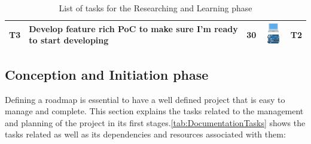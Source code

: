\begin{table}[ht]
{\begin{tabular}{|c|l|c|c|c|}
  \rowcolor[HTML]{C0C0C0}
T3 &
  \textbf{Develop feature rich PoC to make sure I'm ready to start developing} &
   30 &
   \includegraphics[height=4mm]{Figures/laptop_emoji.png}
   \includegraphics[height=4mm]{Figures/microcontroller_emoji.png}&
  T2 \\ \hline
\end{tabular}%
}
\caption{List of tasks for the Researching and Learning phase}
\label{tab:InitialTasks}
\end{table}


\subsection{Conception and Initiation phase}
Defining a roadmap is essential to have a well defined project that is easy to manage and complete. This section explains the tasks related to the management and planning of the project in its first stages.\autoref{tab:DocumentationTasks} shows the tasks related as well as its dependencies and resources associated with them: 

